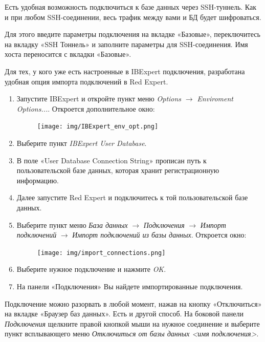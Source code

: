 
Есть удобная возможность подключиться к базе данных через SSH-туннель. Как и при любом SSH-соединении, весь трафик между вами и БД будет шифроваться.

Для этого введите параметры подключения на вкладке «Базовые», переключитесь на вкладку «SSH Тоннель» и заполните параметры для SSH-соединения. Имя хоста переносится с вкладки «Базовые».

Для тех, у кого уже есть настроенные в IBExpert подключения, разработана удобная опция импорта подключений в Red Expert.

\begin{enumerate}[leftmargin=15pt]
	\item Запустите IBExpert и откройте пункт меню \textit{Options} $\rightarrow$ \textit{Enviroment Options...}. Откроется дополнительное окно:
	\begin{figure}[H]
		\centering
		\texttt{[image: img/IBExpert\_env\_opt.png]}
	\end{figure}
	\item Выберите пункт \textit{IBExpert User Database}.
	\item В поле «User Database Connection String» прописан путь к пользовательской базе данных, которая хранит регистрационную информацию.
	\item Далее запустите Red Expert и подключитесь к той пользовательской базе данных.
	\item Выберите пункт меню \textit{База данных} $\rightarrow$ \textit{Подключения} $\rightarrow$ \textit{Импорт подключений} $\rightarrow$ \textit{Импорт подключений из базы данных}. Откроется окно:
	\begin{figure}[H]
		\centering
		\texttt{[image: img/import\_connections.png]}
	\end{figure}
	\item Выберите нужное подключение и нажмите \textit{OK}.
	\item На панели «Подключения» Вы найдете импортированные подключения.
\end{enumerate}	


Подключение можно разорвать в любой момент, нажав на кнопку «Отключиться» на вкладке «Браузер баз данных». Есть и другой способ. На боковой панели \textit{Подключения} щелкните правой кнопкой мыши на нужное соединение и выберите пункт всплывающего меню \textit{Отключиться от базы данных <имя подключения>}.

